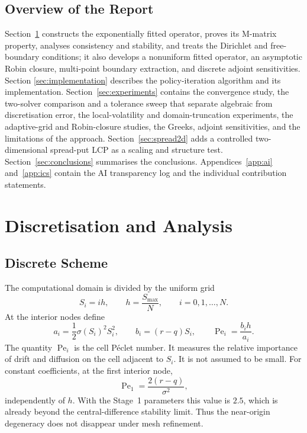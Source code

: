 \documentclass[11pt,a4paper]{article}
\theoremstyle{definition}
\theoremstyle{remark}
\begin{document}
\subsection{Overview of the Report}
Section~\ref{sec:discretisation} constructs the exponentially fitted
 operator, proves its M-matrix property, analyses consistency and stability,
 and treats the Dirichlet and free-boundary conditions; it also develops a
 nonuniform fitted operator, an asymptotic Robin closure, multi-point
 boundary extraction, and discrete adjoint sensitivities. Section
\ref{sec:implementation} describes the policy-iteration algorithm and its
implementation. Section~\ref{sec:experiments} contains the convergence study,
the two-solver comparison and a tolerance sweep that separate algebraic from
discretisation error, the local-volatility and domain-truncation experiments,
the adaptive-grid and Robin-closure studies, the Greeks, adjoint sensitivities,
and the limitations of the approach. Section~\ref{sec:spread2d} adds a controlled two-dimensional
 spread-put LCP as a scaling and structure test. Section~\ref{sec:conclusions}
 summarises the conclusions.
Appendices~\ref{app:ai} and~\ref{app:ics} contain the AI transparency log and
the individual contribution statements.

\newpage
\section{Discretisation and Analysis}
\label{sec:discretisation}

\subsection{Discrete Scheme}
The computational domain is divided by the uniform grid
\begin{equation}
    S_i=ih,
    \qquad
    h=\frac{S_{\max}}{N},
    \qquad
    i=0,1,\ldots,N.
    \label{eq:grid}
\end{equation}
At the interior nodes define
\begin{equation}
    a_i=\frac12\sigma(S_i)^2S_i^2,
    \qquad
    b_i=(r-q)S_i,
    \qquad
    \operatorname{Pe}_i=\frac{b_ih}{a_i}.
    \label{eq:coefficients}
\end{equation}
The quantity $\operatorname{Pe}_i$ is the cell P\'eclet number. It measures
the relative importance of drift and diffusion on the cell adjacent to
$S_i$. It is not assumed to be small. For constant coefficients, at the first
interior node,
\begin{equation}
    \operatorname{Pe}_1=\frac{2(r-q)}{\sigma^2},
    \label{eq:first-peclet}
\end{equation}
independently of $h$. With the Stage~1 parameters this value is $2.5$, which
is already beyond the central-difference stability limit. Thus the
near-origin degeneracy does not disappear under mesh refinement.
\end{document}
